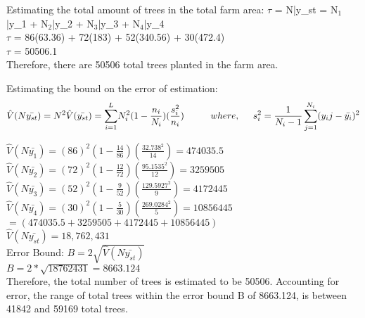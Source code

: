 \documentclass{article}
\begin{document}
\medskip

\begin{center}
Estimating the total amount of trees in the total farm area: 
$\tau$ = N\bar{y_{st}} = N$_1$\bar{y_1} + N$_2$\bar{y_2} + N$_3$\bar{y_3} + N$_4$\bar{y_4}\\
$\tau$ = 86(63.36) + 72(183) + 52(340.56) + 30(472.4) \\
$\tau$ = 50506.1 \\
Therefore, there are 50506 total trees planted in the farm area. \\

\end{center}

\midskip

\begin{center}
Estimating the bound on the error of estimation: 
\begin{equation}
\hat{V} (N\bar{y_{st}}) = N^{2} \hat{V} (\bar{y_{st}}) = {\sum^{L}_{i=1}} {N^{2}_{i}} (1 - \frac{n_{i}}{N_{i}}) (\frac{s_{i}^2}{n_i}) \hspace{1cm} where, \hspace{.5cm} s_{i}^2 = \frac{1}{N_i - 1} \sum^{N_i}_{j=1} (y_ij - \bar{y_i})^2 \\
\end{equation}

$\hat{V} (N\bar{y_{1}}) = (86)^2 (1 - \frac{14}{86}) (\frac{32.738^2}{14}) = 474035.5$ \\

$\hat{V} (N\bar{y_{2}}) = (72)^{2} (1 - \frac{12}{72}) (\frac{95.1535^2}{12}) = 3259505$\\

$\hat{V} (N\bar{y_{3}}) = (52)^2 (1 - \frac{9}{52}) (\frac{129.5927^2}{9}) = 4172445$\\

$\hat{V} (N\bar{y_{4}}) = (30)^2 (1 - \frac{5}{30}) (\frac{269.0284^2}{5}) = 10856445$\\

$=(474035.5 + 3259505 + 4172445 + 10856445)$ \\
$\hat{V} (N\bar{y_{st}}) = 18,762,431 $\\

\smallskip
Error Bound: $B = 2\sqrt{\hat{V} (N\bar{y_{st}})}$ \\
$B = 2*\sqrt{18762431} = 8663.124 $ \\
\smallskip
Therefore, the total number of trees is estimated to be 50506. Accounting for error, the range of total trees within the error bound B of 8663.124, is between 41842 and 59169 total trees. 
\end{center}
\end{document}
